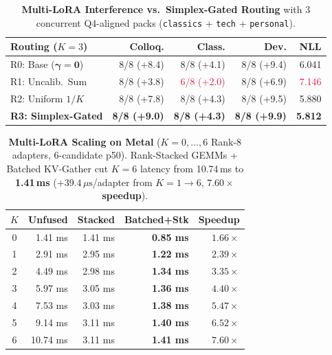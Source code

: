 \documentclass[10pt,twocolumn,letterpaper]{article}
\begin{document}
\begin{table}[t]
  \centering
  {\small
  \setlength{\tabcolsep}{2.5pt}
  \begin{tabular*}{\columnwidth}{@{\extracolsep{\fill}}lrrrr@{}}
    \toprule
    \textbf{Routing ($K=3$)} & \textbf{Colloq.} & \textbf{Class.} & \textbf{Dev.} & \textbf{NLL} \\
    \midrule
    R0: Base ($\bm{\gamma}=\bm{0}$) & 8/8 (+8.4) & 8/8 (+4.1) & 8/8 (+9.4) & 6.041 \\
    R1: Uncalib.\ Sum & 8/8 (+3.8) & \textcolor{crimson}{6/8 (+2.0)} & 8/8 (+6.9) & \textcolor{crimson}{7.146} \\
    R2: Uniform $1/K$ & 8/8 (+7.8) & 8/8 (+4.3) & 8/8 (+9.5) & 5.880 \\
    \textbf{R3: Simplex-Gated} & \textbf{8/8 (+9.0)} & \textbf{8/8 (+4.3)} & \textbf{8/8 (+9.9)} & \textbf{5.812} \\
    \bottomrule
  \end{tabular*}%
  }
  \vspace{-0.3em}
  \caption{\textbf{Multi-LoRA Interference vs.\ Simplex-Gated Routing} with 3 concurrent Q4-aligned packs (\texttt{classics} + \texttt{tech} + \texttt{personal}).}
  \label{tab:routing}
\end{table}

\begin{table}[t]
  \centering
  {\small
  \setlength{\tabcolsep}{3.5pt}
  \begin{tabular*}{\columnwidth}{@{\extracolsep{\fill}}crrrr@{}}
    \toprule
    $K$ & \textbf{Unfused} & \textbf{Stacked} & \textbf{Batched+Stk} & \textbf{Speedup} \\
    \midrule
    0 & 1.41 ms & 1.41 ms & \textbf{0.85 ms} & $\bm{1.66\times}$ \\
    1 & 2.91 ms & 2.95 ms & \textbf{1.22 ms} & $\bm{2.39\times}$ \\
    2 & 4.49 ms & 2.98 ms & \textbf{1.34 ms} & $\bm{3.35\times}$ \\
    3 & 5.97 ms & 3.05 ms & \textbf{1.36 ms} & $\bm{4.40\times}$ \\
    4 & 7.53 ms & 3.03 ms & \textbf{1.38 ms} & $\bm{5.47\times}$ \\
    5 & 9.14 ms & 3.11 ms & \textbf{1.40 ms} & $\bm{6.52\times}$ \\
    6 & 10.74 ms & 3.11 ms & \textbf{1.41 ms} & $\bm{7.60\times}$ \\
    \bottomrule
  \end{tabular*}%
  }
  \vspace{-0.3em}
  \caption{\textbf{Multi-LoRA Scaling on Metal} ($K = 0, \dots, 6$ Rank-8 adapters, 6-candidate p50). Rank-Stacked GEMMs + Batched KV-Gather cut $K=6$ latency from 10.74\,ms to \textbf{1.41\,ms} ($+39.4\,\mu\text{s}$/adapter from $K = 1 \to 6$, \textbf{$7.60\times$ speedup}).}
  \label{tab:scaling}
\end{table}
\end{document}

